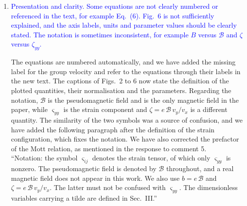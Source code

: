 \documentclass[aps,prb,onecolumn,nofootinbib,citeautoscript,10pt]{revtex4-2}
\begin{document}
\begin{enumerate}
We have added a statement of the new ingredients to the ``Introduction'' section. They are the tilt-induced contribution to the group velocity, the thermoelectric and thermal coefficients, and the test of the Mott relation and the Wiedemann-Franz law. We have stated that the results reduce to those of the untilted case for $\eta_x=0$, which is the reference used in Fig.~4, and that the isotropic case corresponds to $v_y/v_x=1$ in the same formulas. We have also related the spectrum to the PLL sequences observed in strained graphene nanobubbles. The new text, placed at the end of the Introduction, reads as follows.\\``The new ingredients, compared with Refs.~[strained-dirac-franz, complex-LL-strained-graphene], are the tilt-induced contribution to the group velocity of the PLLs, the computation of the thermoelectric and thermal coefficients, and the test of the Mott relation and the Wiedemann-Franz law. For $\eta_x=0$, the spectrum reduces to the dispersive PLLs of the untilted anisotropic cone, and all the results below reduce to those of the untilted case. Scanning tunnelling spectroscopy of strained graphene nanobubbles [levy10] has resolved sequences of PLLs, which are consistent with the Dirac-like ladder that our spectrum reproduces at leading order [cf. Sec.~II~B]. The dispersion in $k_x$, which is the central ingredient for the longitudinal response, is not accessed by those experiments.''

\item \textcolor{blue}{Presentation and clarity. Some equations are not clearly numbered or referenced in the text, for example Eq.~(6). Fig.~6 is not sufficiently explained, and the axis labels, units and parameter values should be clearly stated. The notation is sometimes inconsistent, for example $B$ versus $\mathcal B$ and $\zeta$ versus $\zeta_{yy}$.}

The equations are numbered automatically, and we have added the missing label for the group velocity and refer to the equations through their labels in the new text. The captions of Figs.~2 to 6 now state the definition of the plotted quantities, their normalisation and the parameters. Regarding the notation, $\mathcal B$ is the pseudomagnetic field and is the only magnetic field in the paper, while $\varsigma_{yy}$ is the strain component and $\zeta=e\,\mathcal B\,v_y/v_x$ is a different quantity. The similarity of the two symbols was a source of confusion, and we have added the following paragraph after the definition of the strain configuration, which fixes the notation. We have also corrected the prefactor of the Mott relation, as mentioned in the response to comment 5.\\``Notation: the symbol $\varsigma_{ij}$ denotes the strain tensor, of which only $\varsigma_{yy}$ is nonzero. The pseudomagnetic field is denoted by $\mathcal B$ throughout, and a real magnetic field does not appear in this work. We also use $b=e\,\mathcal B$ and $\zeta=e\,\mathcal B\,v_y/v_x$. The latter must not be confused with $\varsigma_{yy}$. The dimensionless variables carrying a tilde are defined in Sec.~III.''


\end{enumerate}
\end{document}
